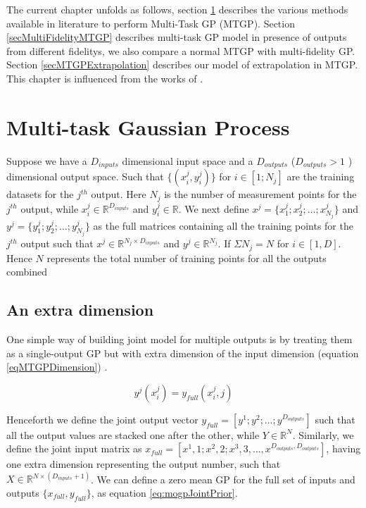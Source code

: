 The current chapter unfolds as follows, section \ref{secMTGP} describes the various methods available in literature to perform Multi-Task GP (MTGP). Section \ref{secMultiFidelityMTGP} describes multi-task GP model in presence of outputs from different fidelitys, we also compare a normal MTGP with multi-fidelity GP. Section \ref{secMTGPExtrapolation} describes our model of extrapolation in MTGP. This chapter is influenced from the works of \cite{forrester2007multi, alvarez2011kernels, bonilla_multi-task_2008, Boyle05dependentgaussian, kennedy2000predicting, le2013multi}.

\section{Multi-task Gaussian Process}\label{secMTGP}
Suppose we have a \(D_{inputs}\) dimensional input space and a \(D_{outputs}\) (\(D_{outputs} > 1\) ) dimensional output space. Such that \(\{(x_{i}^{j}, y_{i}^{j})\}\) for \(i \in [1; N_{j}]\) are the training datasets for the \(j^{th}\) output. Here \(N_{j}\) is the number of measurement points for the \(j^{th}\) output, while \(x_{i}^{j} \in \mathbb{R}^{D_{inputs}}\) and \(y_{i}^{j} \in \mathbb{R}\). We next define \(x^{j} = \{x_{1}^{j}; x_{2}^{j}; \ldots ; x_{N_{j}}^{j}\}\) and \(y^{j} = \{y_{1}^{j}; y_{2}^{j}; \ldots ; y_{N_{j}}^{j}\}\) as the full matrices containing all the training points for the \(j^{th}\) output such that \(x^{j} \in \mathbb{R}^{N_{j} \times D_{inputs}}\) and \(y^{j} \in \mathbb{R}^{N_{j}}\). If \(\Sigma N_{j} = N\) for \(i \in [1, D]\). Hence \(N\) represents the total number of training points for all the outputs combined

\subsection{An extra dimension}\label{subsecAnExtraDimension}
One simple way of building joint model for multiple outputs is by treating them as a single-output GP but with extra dimension of the input dimension (equation \ref{eqMTGPDimension}) \cite{osborne2010bayesian}. 

\begin{equation}\label{eqMTGPDimension}
    y^{j}(x_{i}^{j}) = y_{full}(x_{i}^{j}, j)
\end{equation}

Henceforth we define the joint output vector \(y_{full} = [y^{1}; y^{2}; \ldots; y^{D_{outputs}}]\) such that all the output values are stacked one after the other, while \(Y \in \mathbb{R}^{N}\). Similarly, we define the joint input matrix as \(x_{full} = [x^{1}, 1; x^{2}, 2; x^{3}, 3, \ldots, x^{D_{outputs}, D_{outputs}}]\), having one extra dimension representing the output number, such that \(X \in \mathbb{R}^{N \times (D_{inputs}+1)}\). We can define a zero mean GP for the full set of inputs and outputs $\{x_{full}, y_{full}\}$, as equation \ref{eq:mogpJointPrior}.

